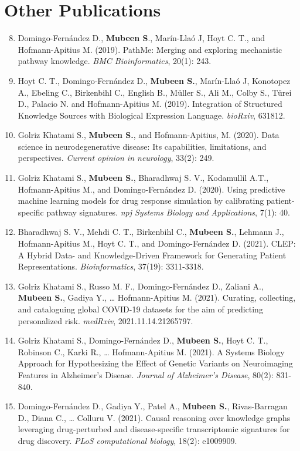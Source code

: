 \section*{Other Publications}

\begin{enumerate}
    \setcounter{enumi}{7}
    \item Domingo-Fern\'{a}ndez D., \textbf{Mubeen S}., Marín-Llaó J, Hoyt C. T., and Hofmann-Apitius M. (2019). PathMe: Merging and exploring mechanistic pathway knowledge. \textit{BMC Bioinformatics}, 20(1): 243.
    \item Hoyt C. T., Domingo-Fern\'{a}ndez D., \textbf{Mubeen S.}, Marín-Llaó J, Konotopez A., Ebeling C., Birkenbihl C., English B., Müller S., Ali M., Colby S., Türei D., Palacio N. and Hofmann-Apitius M. (2019). Integration of Structured Knowledge Sources with Biological Expression Language. \textit{bioRxiv}, 631812.
    \item Golriz Khatami S., \textbf{Mubeen S.}, and Hofmann-Apitius, M. (2020). Data science in neurodegenerative disease: Its capabilities, limitations, and perspectives. \textit{Current opinion in neurology}, 33(2): 249.
    \item Golriz Khatami S., \textbf{Mubeen S.}, Bharadhwaj S. V., Kodamullil A.T., Hofmann-Apitius M., and Domingo-Fern\'{a}ndez D. (2020). Using predictive machine learning models for drug response simulation by calibrating patient-specific pathway signatures. \textit{npj Systems Biology and Applications}, 7(1): 40.
    \item Bharadhwaj S. V., Mehdi C. T., Birkenbihl C., \textbf{Mubeen S.}, Lehmann J., Hofmann-Apitius M., Hoyt C. T., and Domingo-Fern\'{a}ndez D. (2021). CLEP: A Hybrid Data- and Knowledge-Driven Framework for Generating Patient Representations. \textit{Bioinformatics}, 37(19): 3311-3318.
    \item Golriz Khatami S., Russo M. F., Domingo-Fern\'{a}ndez D., Zaliani A., \textbf{Mubeen S.}, Gadiya Y., … Hofmann-Apitius M. (2021). Curating, collecting, and cataloguing global COVID-19 datasets for the aim of predicting personalized risk. \textit{medRxiv}, 2021.11.14.21265797.
    \item Golriz Khatami S., Domingo-Fern\'{a}ndez D., \textbf{Mubeen S.}, Hoyt C. T., Robinson C., Karki R., … Hofmann-Apitius M. (2021). A Systems Biology Approach for Hypothesizing the Effect of Genetic Variants on Neuroimaging Features in Alzheimer’s Disease. \textit{Journal of Alzheimer's Disease}, 80(2): 831-840.
    \item Domingo-Fern\'{a}ndez D., Gadiya Y., Patel A., \textbf{Mubeen S.}, Rivas-Barragan D., Diana C., … Colluru V. (2021). Causal reasoning over knowledge graphs leveraging drug-perturbed and disease-specific transcriptomic signatures for drug discovery. \textit{PLoS computational biology}, 18(2): e1009909.

\end{enumerate}

